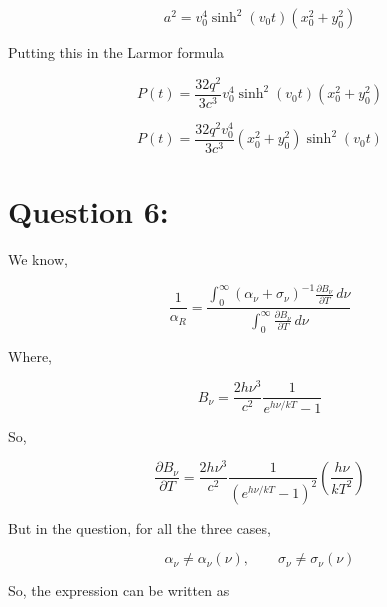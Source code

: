 \documentclass{article}
\begin{document}
\begin{equation}
a^2=v_0^4\sinh^2(v_0 t)(x_0^2+y_0^2)
\end{equation}

Putting this in the Larmor formula

\begin{equation}
P(t)=
\frac{32q^2}{3c^3}
v_0^4\sinh^2(v_0 t)
(x_0^2+y_0^2)
\end{equation}

\begin{equation}
\boxed{
P(t)=
\frac{32q^2v_0^4}{3c^3}
(x_0^2+y_0^2)\sinh^2(v_0 t)
}
\end{equation}





\section{Question 6:}










We know,

\begin{equation}
\frac{1}{\alpha_R}
=
\frac{\int_0^{\infty} (\alpha_\nu+\sigma_\nu)^{-1}
\frac{\partial B_\nu}{\partial T}\,d\nu}
{\int_0^{\infty}\frac{\partial B_\nu}{\partial T}\,d\nu}
\end{equation}

Where,

\begin{equation}
B_\nu=\frac{2h\nu^3}{c^2}\frac{1}{e^{h\nu/kT}-1}
\end{equation}

So,

\begin{equation}
\frac{\partial B_\nu}{\partial T}
=
\frac{2h\nu^3}{c^2}
\frac{1}{(e^{h\nu/kT}-1)^2}
\left(\frac{h\nu}{kT^2}\right)
\end{equation}

But in the question, for all the three cases,

\begin{equation}
\alpha_\nu \neq \alpha_\nu(\nu), \qquad
\sigma_\nu \neq \sigma_\nu(\nu)
\end{equation}

So, the expression can be written as
\end{document}
